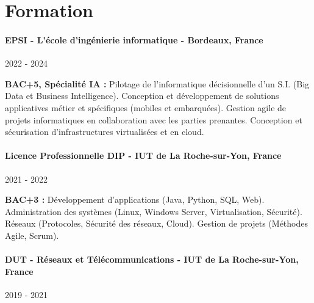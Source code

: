 \documentclass{article}
\begin{document}
\vspace{2ex}
\hrulefill
\section*{Formation}

\paragraph{EPSI - L'école d'ingénierie informatique - Bordeaux, France} \hspace*{\fill} 2022 - 2024  
\vspace{0.5\baselineskip}


\textbf{BAC+5, Spécialité IA :} Pilotage de l’informatique décisionnelle d’un S.I. (Big Data et Business Intelligence). Conception et développement de solutions applicatives métier et spécifiques (mobiles et embarquées). Gestion agile de projets informatiques en collaboration avec les parties prenantes. Conception et sécurisation d’infrastructures virtualisées et en cloud.
\vspace{0.5\baselineskip} %


\paragraph{Licence Professionnelle DIP - IUT de La Roche-sur-Yon, France} \hspace*{\fill} 2021 - 2022  
\vspace{0.5\baselineskip}

\textbf{BAC+3 :} Développement d'applications (Java, Python, SQL, Web). Administration des systèmes (Linux, Windows Server, Virtualisation, Sécurité). Réseaux (Protocoles, Sécurité des réseaux, Cloud). Gestion de projets (Méthodes Agile, Scrum).
\vspace{0.5\baselineskip} %


\paragraph{DUT - Réseaux et Télécommunications - IUT de La Roche-sur-Yon, France} \hspace*{\fill} 2019 - 2021  
\vspace{0.5\baselineskip}
\end{document}
